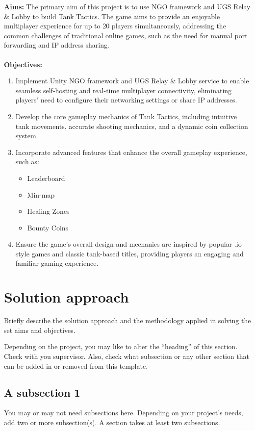 \textbf{Aims:} The primary aim of this project is to use NGO framework and UGS Relay \& Lobby to build Tank Tactics. The game aims to provide an enjoyable multiplayer experience for up to 20 players simultaneously, addressing the common challenges of traditional online games, such as the need for manual port forwarding and IP address sharing.\\
\\
\textbf{Objectives:}
\begin{enumerate}
    \item Implement Unity NGO framework and UGS Relay \& Lobby service to enable seamless self-hosting and real-time multiplayer connectivity, eliminating players' need to configure their networking settings or share IP addresses.
    \item Develop the core gameplay mechanics of Tank Tactics, including intuitive tank movements, accurate shooting mechanics, and a dynamic coin collection system.
    \item Incorporate advanced features that enhance the overall gameplay experience, such as:
    \begin{itemize}
        \item Leaderboard
        \item Min-map
        \item Healing Zones
        \item Bounty Coins
    \end{itemize}
    \item Ensure the game's overall design and mechanics are inspired by popular .io style games and classic tank-based titles, providing players an engaging and familiar gaming experience.
\end{enumerate}



\section{Solution approach}
\label{sec:intro_sol} %
Briefly describe the solution approach and the methodology applied in solving the set aims and objectives.

Depending on the project, you may like to alter the ``heading'' of this section. Check with you supervisor. Also, check what subsection or any other section that can be added in or removed from this template.

\subsection{A subsection 1}
\label{sec:intro_some_sub1}
You may or may not need subsections here. Depending on your project's needs, add two or more subsection(s). A section takes at least two subsections. 

